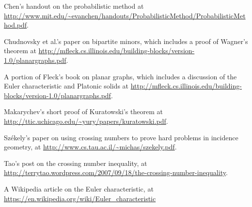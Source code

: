 \documentclass[11pt,paper=letter]{scrartcl}
\begin{document}
\begin{thebibliography}{99}

 Chen's handout on the probabilistic method at \url{http://www.mit.edu/~evanchen/handouts/ProbabilisticMethod/ProbabilisticMethod.pdf}.

 Chudnovsky et al.'s paper on bipartite minors, which includes a proof of Wagner's theorem at \url{http://mfleck.cs.illinois.edu/building-blocks/version-1.0/planargraphs.pdf}.

 A portion of Fleck's book on planar graphs, which includes a discussion of the Euler characteristic and Platonic solids at \url{http://mfleck.cs.illinois.edu/building-blocks/version-1.0/planargraphs.pdf}.

 Makarychev's short proof of Kuratowski's theorem at \url{http://ttic.uchicago.edu/~yury/papers/kuratowski.pdf}.

 Sz\'{e}kely's paper on using crossing numbers to prove hard problems in incidence geometry, at \url{http://www.cs.tau.ac.il/~michas/szekely.pdf}.

 Tao's post on the crossing number inequality, at \url{http://terrytao.wordpress.com/2007/09/18/the-crossing-number-inequality}.

 A Wikipedia article on the Euler characteristic, at \url{https://en.wikipedia.org/wiki/Euler_characteristic}

\end{thebibliography}
\end{document}

